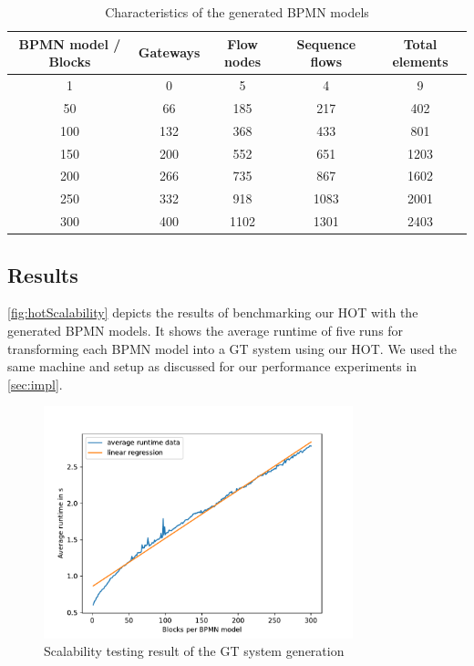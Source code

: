 \documentclass{lmcs} %
\begin{document}
\begin{table}[ht]
\centering
\caption{Characteristics of the generated BPMN models}
\begin{tabular}{| c | c | c | c || c |}
 \hline
 BPMN model / Blocks & Gateways & Flow nodes & Sequence flows & Total elements \\
 \hline\hline
 1 & 0 & 5 & 4 & 9 \\
 \hline
 50 & 66 & 185 & 217 & 402 \\
 \hline
 100 & 132 & 368 & 433 & 801 \\
 \hline
 150 & 200 & 552 & 651 & 1203 \\
 \hline
 200 & 266 & 735 & 867 & 1602 \\
 \hline
 250 & 332 & 918 & 1083 & 2001 \\
 \hline
 300 & 400 & 1102 & 1301 & 2403 \\
 \hline
\end{tabular}
\label{table:bpmnModelCharacteristics}
\end{table}

\subsection{Results}

\autoref{fig:hotScalability} depicts the results of benchmarking our HOT with the generated BPMN models.
It shows the average runtime of five runs for transforming each BPMN model into a GT system using our HOT.
We used the same machine and setup as discussed for our performance experiments in \autoref{sec:impl}.

\begin{figure}[ht]
    \centering
    \includegraphics[width=0.8\textwidth]{images/HOT_scalability.pdf}
    \caption{Scalability testing result of the GT system generation}
    \label{fig:hotScalability}
\end{figure}
\end{document}
